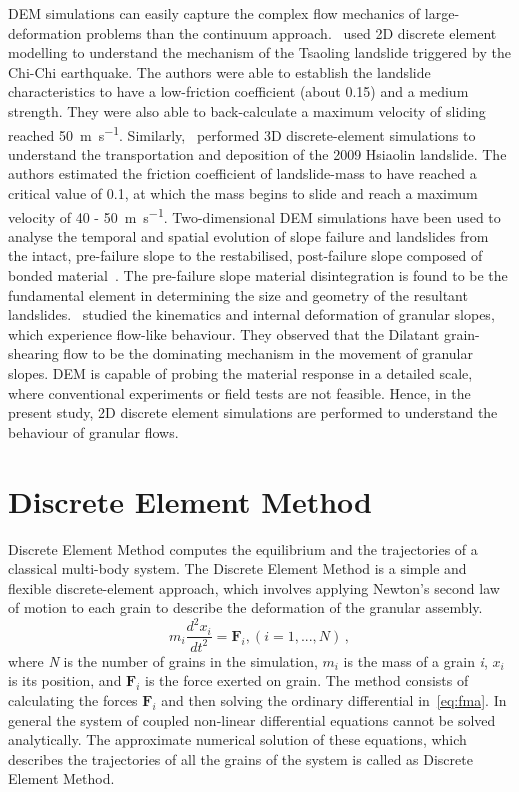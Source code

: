 DEM simulations can easily capture the complex flow mechanics of 
large-deformation problems than the continuum approach.~\cite{Tang2009} used 2D 
discrete element modelling to understand the mechanism of the Tsaoling 
landslide triggered by the Chi-Chi earthquake. The authors were able to 
establish the landslide characteristics to have a low-friction coefficient 
(about 0.15) and a medium strength. They were also able to back-calculate a 
maximum velocity of sliding reached 50~\si{\m\per\s}. 
Similarly,~\cite{Tang2013} performed 3D discrete-element simulations to 
understand the 
transportation and deposition of the 2009 Hsiaolin landslide. The authors 
estimated the friction coefficient of landslide-mass to have reached a critical 
value of 0.1, at which the mass begins to slide and reach a maximum velocity of 
40 - 50~\si{\m\per\s}. Two-dimensional DEM simulations have been used to 
analyse the temporal and spatial evolution of slope failure and landslides from 
the intact, pre-failure slope to the restabilised, post-failure slope composed 
of bonded material~\citep{Katz2014}. The pre-failure slope material 
disintegration is found to be the fundamental element in determining the size 
and geometry of the resultant landslides.~\citet{Liu2013} studied the 
kinematics and internal deformation of granular slopes, which experience 
flow-like behaviour. They observed that the Dilatant grain-shearing flow to be 
the dominating mechanism in the movement of granular slopes. DEM is capable of 
probing the material response in a detailed scale, where conventional 
experiments or field tests are not feasible. Hence, in the present study, 2D 
discrete element simulations are performed to understand the behaviour of 
granular flows. 

 

\section{Discrete Element Method}

Discrete Element Method computes the equilibrium and the trajectories of a 
classical multi-body system. The Discrete Element Method is a simple and 
flexible discrete-element approach, which involves applying Newton's second law 
of motion to each grain to describe the deformation of the granular assembly. 
% 
\begin{equation} 
{m}_{i}\frac{{{d}^{2}}{{x}_{i}}}{d{{t}^{2}}} = {{\mathbf{F}}_{i}}, 
(i=1,...,N ) \,,
\label{eq:fma}
\end{equation}
%
where \textit{N} is the number of grains in the simulation, $m_{\mathit{i}}$ 
is the mass of a grain \textit{i}, $x_{\mathit{i}}$ is its position, and 
$\mathbf{F}_{\mathit{i}}$ is the force exerted on grain. The method consists of 
calculating the forces $\mathbf{F}_{\mathit{i}}$ and then solving 
the ordinary differential in~\cref{eq:fma}. In general the system of coupled 
non-linear differential equations cannot be solved analytically. The 
approximate numerical solution of these equations, which describes the 
trajectories of all the grains of the system is called as Discrete Element 
Method.

